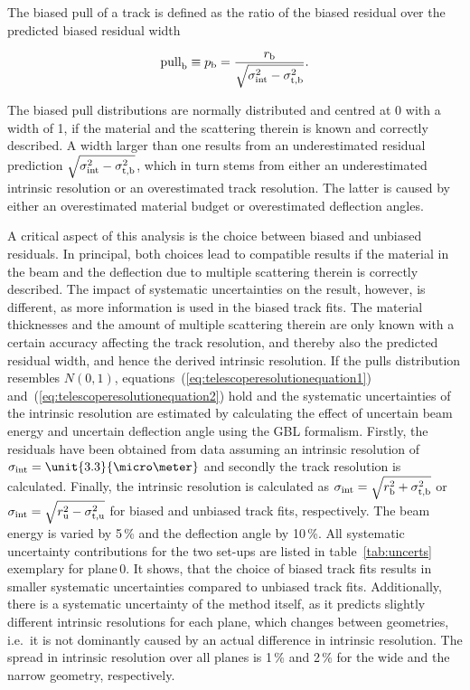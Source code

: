 The biased pull of a track is defined as the ratio of the biased residual over the predicted biased residual width

\begin{equation}
 \textrm{pull}_{\textrm{b}} \equiv p_{\textrm{b}} = \frac{r_{\textrm{b}}}{\sqrt{\sigma_{\textrm{int}}^2 - \sigma_{\textrm{t,b}}^2}}.
 \label{eq:pull}
\end{equation}

\noindent
The biased pull distributions are normally distributed and centred at 0 with a width of 1, if the material and the scattering therein is known and correctly described. 
A width larger than one results from an underestimated residual prediction $\sqrt{\sigma_{\textrm{int}}^2 - \sigma_{\textrm{t,b}}^2}$, which in turn stems from either an underestimated intrinsic resolution
 or an overestimated track resolution. 
The latter is caused by either an overestimated material budget or overestimated deflection angles. 


A critical aspect of this analysis is the choice between biased and unbiased residuals. 
In principal, both choices lead to compatible results if the material in the beam and the deflection due to multiple scattering therein is correctly described. 
The impact of systematic uncertainties on the result, however, is different, as more information is used in the biased track fits. 
The material thicknesses and the amount of multiple scattering therein are only known with a certain accuracy affecting the track resolution, and thereby also the predicted residual width, 
 and hence the derived intrinsic resolution. 
If the pulls distribution resembles $N(0,1)$, equations~(\ref{eq:telescoperesolutionequation1}) and~(\ref{eq:telescoperesolutionequation2}) hold and the systematic uncertainties of the intrinsic resolution
 are estimated by calculating the effect of uncertain beam energy and uncertain deflection angle using the GBL formalism. 
Firstly, the residuals have been obtained from data assuming an intrinsic resolution of $\sigmai = \unit{3.3}{\micro\meter}$ and secondly the track resolution is calculated. 
Finally, the intrinsic resolution is calculated as $\sigma_{\textrm{int}} = \sqrt{r_{\textrm{b}}^2 + \sigma_{\textrm{t,b}}^2}$ or $\sigma_{\textrm{int}} = \sqrt{r_{\textrm{u}}^2 - \sigma_{\textrm{t,u}}^2}$ for biased and unbiased track fits, respectively. 
The beam energy is varied by 5\,\% and the deflection angle by 10\,\%. 
All systematic uncertainty contributions for the two set-ups are listed in table~\ref{tab:uncerts} exemplary for plane\,0.
It shows, that the choice of biased track fits results in smaller systematic uncertainties compared to unbiased track fits. 
Additionally, there is a systematic uncertainty of the method itself, as it predicts slightly different intrinsic resolutions for each plane, which changes between geometries,
 i.e.\ it is not dominantly caused by an actual difference in intrinsic resolution. 
The spread in intrinsic resolution over all planes is 1\,\% and 2\,\% for the wide and the narrow geometry, respectively. 

